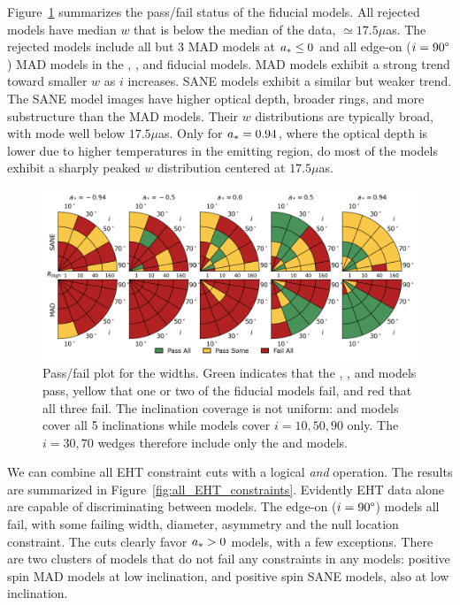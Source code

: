 Figure~\ref{fig:mring_width_salsa} summarizes the \mring  pass/fail status of the fiducial models. All rejected models have median $w$ that is below the median of the data, $ \simeq 17.5\mu$as.  The rejected models include all but 3 MAD models at $a_* \le 0$ and all edge-on ($i = 90\degree$) MAD models in the  \kharma, \bhac, and \hamr fiducial models.  MAD models exhibit a strong trend toward smaller $w$ as $i$ increases.  SANE models exhibit a similar but weaker trend. The SANE model images have  higher optical depth, broader rings, and more substructure than the MAD models.  Their $w$ distributions are typically broad, with mode well below $17.5\mu$as.  Only for $a_* = 0.94$, where the optical depth is lower due to higher temperatures in the emitting region, do most of the models exhibit a sharply peaked $w$ distribution centered at $17.5\mu$as.

\begin{figure}\label{fig:mring_width_salsa}
 \centering
 \includegraphics[width=\textwidth]{./figures/Mring_w_Constraints.png}
  \caption{Pass/fail plot for the \mring widths.  Green indicates that the \kharma, \bhac, and \hamr models pass, yellow that one or two of the fiducial models fail, and red that all three fail.  The inclination coverage is not uniform: \bhac and \kharma models cover all 5 inclinations while \hamr models cover $i = 10, 50, 90$ only.  The $i = 30, 70$ wedges therefore include only the \bhac and \kharma models.}
\end{figure}



We can combine all EHT constraint cuts with a logical {\em and} operation.  The results are summarized in Figure~\ref{fig:all_EHT_constraints}.  Evidently EHT data alone are capable of discriminating between models.   The edge-on ($i = 90\degree$) models all fail, with some failing \mring width, diameter, asymmetry and the null location constraint.  The cuts clearly favor $a_* > 0$ models, with a few exceptions.  There are two clusters of models that do not fail any constraints in any models: positive spin MAD models at low inclination, and positive spin SANE models, also at low inclination.   

